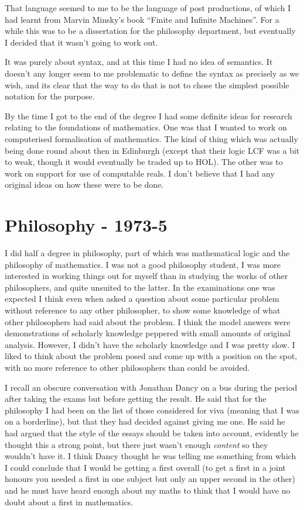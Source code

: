 That language seemed to me to be the language of post productions, of which I had learnt from Marvin Minsky's book ``Finite and Infinite Machines''.
For a while this was to be a dissertation for the philosophy department, but eventually I decided that it wasn't going to work out.

It was purely about syntax, and at this time I had no idea of semantics.
It doesn't any longer seem to me problematic to define the syntax as precisely as we wish, and its clear that the way to do that is not to chose the simplest possible notation for the purpose.

By the time I got to the end of the degree I had some definite ideas for research relating to the foundations of mathematics.
One was that I wanted to work on computerised formalisation of mathematics.
The kind of thing which was actually being done round about then in Edinburgh (except that their logic LCF was a bit to weak, though it would eventually be traded up to HOL).
The other was to work on support for use of computable reals.
I don't believe that I had any original ideas on how these were to be done.

\section{Philosophy - 1973-5}

I did half a degree in philosophy, part of which was mathematical logic and the philosophy of mathematics.
I was not a good philosophy student, I was more interested in working things out for myself than in studying the works of other philosophers, and quite unsuited to the latter.
In the examinations one was expected I think even when asked a question about some particular problem without reference to any other philosopher, to show some knowledge of what other philosophers had said about the problem.
I think the model answers were demonstrations of scholarly knowledge peppered with small amounts of original analysis.
However, I didn't have the scholarly knowledge and I was pretty slow.
I liked to think about the problem posed and come up with a position on the spot, with no more reference to other philosophers than could be avoided.

I recall an obscure conversation with Jonathan Dancy on a bus during the period after taking the exams but before getting the result.
He said that for the philosophy I had been on the list of those considered for viva (meaning that I was on a borderline), but that they had decided against giving me one.
He said he had argued that the style of the essays should be taken into account, evidently he thought this a strong point, but there just wasn't enough {\it content} so they wouldn't have it.
I think Dancy thought he was telling me something from which I could conclude that I would be getting a first overall (to get a first in a joint honours you needed a first in one subject but only an upper second in the other) and he must have heard enough about my maths to think that I would have no doubt about a first in mathematics.

